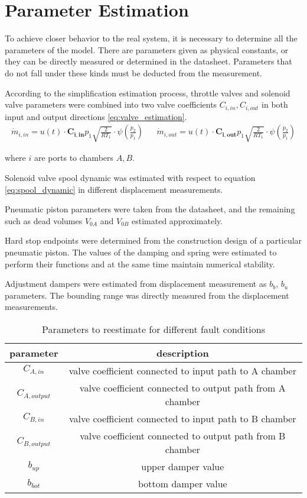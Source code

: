 \section{Parameter Estimation}

To achieve closer behavior to the real system, it is necessary to determine
all the parameters of the model.  There are parameters given as physical
constants, or they can be directly measured or determined in the datasheet.
Parameters that do not fall under these kinds must be deducted from the
measurement.

According to the simplification estimation process, throttle valves and
solenoid valve parameters were combined into two valve coefficients
$C_{i,in}, C_{i,out}$ in both input and output directions \ref{eq:valve_estimation}.
\begin{align}
    \dot{m}_{i,in} = u(t)\cdot \boldsymbol{C_{i,in}} p_1 \sqrt{\frac{2}{RT_1}}
    \cdot \psi\left(\frac{p_2}{p_1}\right) &&
    \dot{m}_{i,out} = u(t)\cdot \boldsymbol{C_{i,out}} p_1 \sqrt{\frac{2}{RT_1}}
    \cdot \psi\left(\frac{p_2}{p_1}\right)
    \label{eq:valve_estimation}
\end{align}

where $i$ are ports to chambers $A, B$.


Solenoid valve spool dynamic was estimated with respect to equation
\ref{eq:spool_dynamic}
in different displacement measurements. 

Pneumatic piston parameters were taken from the datasheet, and the remaining
such as dead volumes $V_{0A}$ and $V_{0B}$ estimated approximately.

Hard stop endpoints were determined from the construction design of a
particular pneumatic piston. The values of the damping and spring were
estimated to perform their functions and at the same time maintain
numerical stability.

Adjustment dampers were estimated from displacement measurement as $b_b$,
$b_u$ parameters. The bounding range was directly measured from the
displacement measurements.

\begin{table}[h]
    \centering
    \begin{tabular}{|c|c|}
        \hline
        \textbf{parameter} & \textbf{description}  \\
        \hline
        $C_{A,in}$      & valve coefficient connected to input path to  A chamber \\
        $C_{A,output}$  & valve coefficient connected to output path from A chamber \\
        $C_{B,in}$      & valve coefficient connected to input path to  B chamber \\
        $C_{B,output}$  & valve coefficient connected to output path from B chamber \\
        $b_{up}$        & upper damper value  \\
        $b_{bot}$       & bottom damper value \\
        \hline
    \end{tabular}
    \caption{Parameters to reestimate for different fault conditions}
    \label{tab:est_params}
\end{table}

